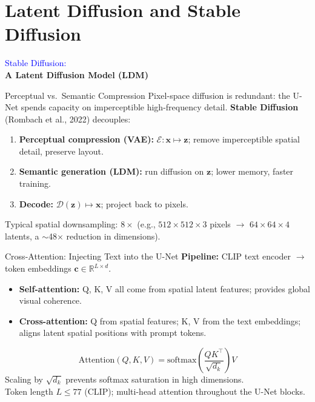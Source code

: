 \section{Latent Diffusion and Stable Diffusion}

\begin{frame}[plain]
    \centering
    \vspace{2cm}
    {\Huge \textcolor{blue}{Stable Diffusion:}\\[1em]
     \textbf{A Latent Diffusion Model (LDM)}}
\end{frame}

\begin{frame}{Perceptual vs.\ Semantic Compression}
  Pixel-space diffusion is redundant: the U-Net spends capacity on imperceptible high-frequency detail.
  \textbf{Stable Diffusion} (Rombach et al., 2022) decouples:
  \begin{enumerate}
    \item \textbf{Perceptual compression (VAE):} $\mathcal{E}: \mathbf{x} \mapsto \mathbf{z}$; remove imperceptible spatial detail, preserve layout.
    \item \textbf{Semantic generation (LDM):} run diffusion on $\mathbf{z}$; lower memory, faster training.
    \item \textbf{Decode:} $\mathcal{D}(\mathbf{z}) \mapsto \mathbf{x}$; project back to pixels.
  \end{enumerate}
  Typical spatial downsampling: $8\times$ (e.g., $512 \times 512 \times 3$ pixels $\rightarrow$ $64 \times 64 \times 4$ latents, a $\sim$48$\times$ reduction in dimensions).
\end{frame}

\begin{frame}{Cross-Attention: Injecting Text into the U-Net}
  \textbf{Pipeline:} CLIP text encoder $\rightarrow$ token embeddings $\mathbf{c} \in \mathbb{R}^{L \times d}$.
  \begin{itemize}
    \item \textbf{Self-attention:} Q, K, V all come from spatial latent features; provides global visual coherence.
    \item \textbf{Cross-attention:} Q from spatial features; K, V from the text embeddings; aligns latent spatial positions with prompt tokens.
  \end{itemize}
  \[
    \mathrm{Attention}(Q, K, V) = \mathrm{softmax}\!\left(\frac{QK^\top}{\sqrt{d_k}}\right) V
  \]
  Scaling by $\sqrt{d_k}$ prevents softmax saturation in high dimensions.\\[0.3em]
  {\footnotesize Token length $L \leq 77$ (CLIP); multi-head attention throughout the U-Net blocks.}
\end{frame}

